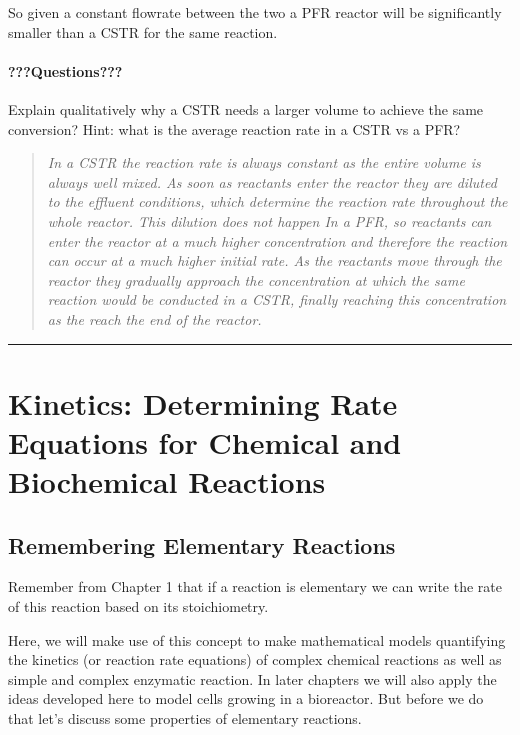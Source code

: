 \documentclass[
]{article}
\begin{document}
So given a constant flowrate between the two a PFR reactor will be significantly smaller than a CSTR for the same reaction.

\hypertarget{questions-6}{%
\paragraph{???Questions???}\label{questions-6}}

Explain qualitatively why a CSTR needs a larger volume to achieve the same conversion? Hint: what is the average reaction rate in a CSTR vs a PFR?

\begin{quote}
\emph{In a CSTR the reaction rate is always constant as the entire volume is always well mixed. As soon as reactants enter the reactor they are diluted to the effluent conditions, which determine the reaction rate throughout the whole reactor. This dilution does not happen In a PFR, so reactants can enter the reactor at a much higher concentration and therefore the reaction can occur at a much higher initial rate. As the reactants move through the reactor they gradually approach the concentration at which the same reaction would be conducted in a CSTR, finally reaching this concentration as the reach the end of the reactor.}
\end{quote}

\begin{center}\rule{0.5\linewidth}{0.5pt}\end{center}

\hypertarget{kinetics-determining-rate-equations-for-chemical-and-biochemical-reactions}{%
\section{Kinetics: Determining Rate Equations for Chemical and Biochemical Reactions}\label{kinetics-determining-rate-equations-for-chemical-and-biochemical-reactions}}

\hypertarget{remembering-elementary-reactions}{%
\subsection{Remembering Elementary Reactions}\label{remembering-elementary-reactions}}

Remember from Chapter 1 that if a reaction is elementary we can write the rate
of this reaction based on its stoichiometry.

Here, we will make use of this concept to make mathematical models quantifying the kinetics (or reaction rate equations) of complex chemical reactions as well as simple and complex enzymatic reaction. In later chapters we will also apply the ideas developed here to model cells growing in a bioreactor. But before we do that let's discuss some properties of elementary reactions.
\end{document}
